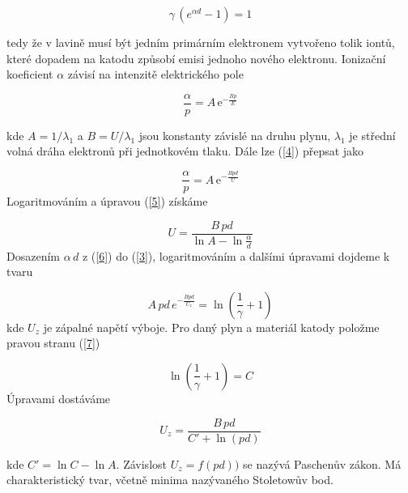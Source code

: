 \documentclass[a4paper,12pt]{article}
\newcommand{\e}{\text{e}}
\begin{document}
\begin{equation}
	\gamma\,(e^{\alpha d } - 1) = 1
	\label{3}
\end{equation} 

tedy že v lavině musí být jedním primárním elektronem vytvořeno tolik iontů, které dopadem na katodu způsobí emisi jednoho nového elektronu. Ionizační koeficient $\alpha$ závisí na intenzitě elektrického pole 

\begin{equation}
	\frac{\alpha}{p} = A\,\e^{-\frac{Bp}{E}} 
	\label{4}
\end{equation}

kde $A = 1/\lambda_1$ a $B = U/\lambda_1$ jsou konstanty závislé na druhu plynu, $\lambda_1$ je střední volná dráha elektronů při jednotkovém tlaku. Dále lze (\ref{4}) přepsat jako

\begin{equation}
	\frac{\alpha}{p} = A\,\e^{-\frac{Bpd}{U}} 
	\label{5}
\end{equation}
Logaritmováním a úpravou (\ref{5}) získáme

\begin{equation}
	U = \frac{B\,pd}{\ln A - \ln \frac{\alpha}{d}}
	\label{6}
\end{equation}
Dosazením $\alpha\,d$ z (\ref{6}) do (\ref{3}), logaritmováním a dalšími úpravami dojdeme k tvaru

\begin{equation}
	A\,pd\,e^{-\frac{Bpd}{U_z}} = \ln \left(\frac{1}{\gamma} + 1\right)
	\label{7}
\end{equation}
kde $U_z$ je zápalné napětí výboje. Pro daný plyn a materiál katody položme pravou stranu (\ref{7})

\begin{equation}
	\ln \left(\frac{1}{\gamma} + 1\right) = C
	\label{8}
\end{equation}
Úpravami dostáváme

\begin{equation}
	U_z = \frac{B\,pd}{C' + \ln(pd)}
	\label{9}
\end{equation}

kde $C' = \ln C - \ln A$. Závislost $U_z = f (pd))$ se nazývá Paschenův zákon. Má charakteristický tvar, včetně minima nazývaného Stoletowův bod.

\end{document}
